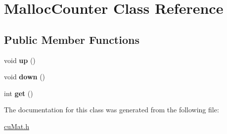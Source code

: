 \hypertarget{classMallocCounter}{}\section{Malloc\+Counter Class Reference}
\label{classMallocCounter}
\subsection*{Public Member Functions}
\begin{DoxyCompactItemize}
\item 
\mbox{\label{classMallocCounter_ab64dbcb93035b353f13bec71072ede6f}} 
void {\bfseries up} ()
\item 
\mbox{\label{classMallocCounter_a1e04b5a0d5ea695284703168a1b9f36d}} 
void {\bfseries down} ()
\item 
\mbox{\label{classMallocCounter_a09a9a5b7ab23212224b38c1bf2f7fc21}} 
int {\bfseries get} ()
\end{DoxyCompactItemize}


The documentation for this class was generated from the following file\+:\begin{DoxyCompactItemize}
\item 
\mbox{\hyperlink{cuMat_8h}{cu\+Mat.\+h}}\end{DoxyCompactItemize}
